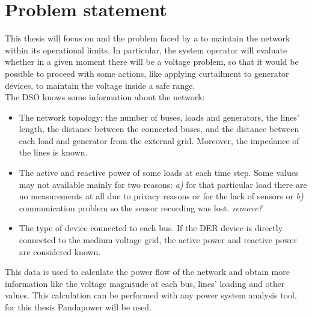 \section{Problem statement}
\label{sec:ps}
This thesis will focus on  and the problem faced by a  to maintain the network within its operational limits. In particular, the system operator will evaluate whether in a given moment there will be a voltage problem, so that it would be possible to proceed with some actions, like applying curtailment to generator devices, to maintain the voltage inside a safe range.\\

The \gls{DSO} knows some information about the network:
\begin{itemize}
    \item The network topology: the number of buses, loads and generators, the lines' length, the distance between the connected buses, and the distance between each load and generator from the external grid. Moreover, the impedance of the lines is known.
    
    \item The active and reactive power of some loads at each time step. Some values may not available mainly for two reasons: \emph{a)} for that particular load there are no measurements at all due to privacy reasons or for the lack of sensors or \emph{b)} communication problem so the sensor recording was lost. \emph{remove?}
    
    \item The type of  device connected to each bus. If the \gls{DER} device is directly connected to the medium voltage grid, the active power and reactive power are considered known. 
\end{itemize}

This data is used to calculate the power flow of the network and obtain more information like the voltage magnitude at each bus, lines' loading and other values. This calculation can be performed with any power system analysis tool, for this thesis Pandapower will be used.\\


